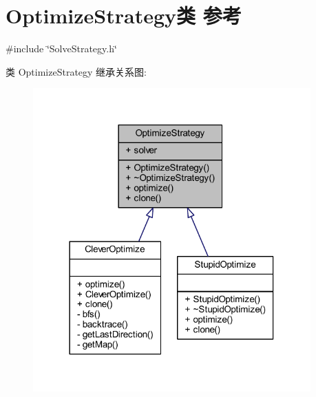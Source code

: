 \hypertarget{classOptimizeStrategy}{}\section{Optimize\+Strategy类 参考}
\label{classOptimizeStrategy}


{\ttfamily \#include \char`\"{}Solve\+Strategy.\+h\char`\"{}}



类 Optimize\+Strategy 继承关系图\+:
\nopagebreak
\begin{figure}[H]
\begin{center}
\leavevmode
\includegraphics[width=302pt]{classOptimizeStrategy__inherit__graph}
\end{center}
\end{figure}


